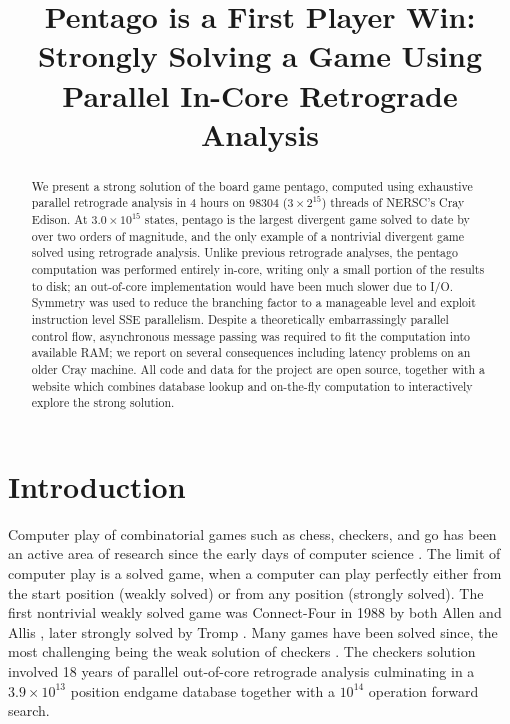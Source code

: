 \documentclass[conference]{IEEEtran}
\begin{document}
\title{Pentago is a First Player Win: Strongly Solving a Game Using Parallel In-Core Retrograde Analysis}
\author{}

\maketitle

\begin{abstract}
\boldmath
We present a strong solution of the board game pentago, computed using exhaustive parallel
retrograde analysis in 4 hours on 98304 ($3 \times 2^{15}$) threads of NERSC's Cray Edison.
At $3.0 \times 10^{15}$ states, pentago is the largest divergent game solved to date by
over two orders of magnitude, and the only example of a nontrivial divergent game solved
using retrograde analysis.
Unlike previous retrograde analyses, the pentago computation was performed entirely in-core,
writing only a small portion of the results to disk; an out-of-core implementation would
have been much slower due to I/O.  Symmetry was used to reduce the branching factor
to a manageable level and exploit instruction level SSE parallelism.  Despite a theoretically
embarrassingly parallel control flow, asynchronous message passing was required to fit the
computation into available RAM; we report on several consequences including latency problems
on an older Cray machine.  All code and data for the project are
open source, together with a website which combines database lookup and on-the-fly computation
to interactively explore the strong solution.
\end{abstract}

\IEEEpeerreviewmaketitle

\section{Introduction}

Computer play of combinatorial games such as chess, checkers, and go has been an active area of research
since the early days of computer science \cite{shannon1950chess}.  The limit of computer play is a solved
game, when a computer can play perfectly either from the start position (weakly solved) or from any
position (strongly solved).  The first nontrivial weakly solved game was Connect-Four in 1988 by both
Allen and Allis \cite{allis1988connectfour}, later strongly solved by Tromp \cite{tromp1995}.  Many games
have been solved since, the most challenging being the weak solution of checkers \cite{schaeffer2007checkers}.
The checkers solution involved 18 years of parallel out-of-core retrograde analysis culminating in a
$3.9 \times 10^{13}$ position endgame database together with a $10^{14}$ operation forward search.
\end{document}
